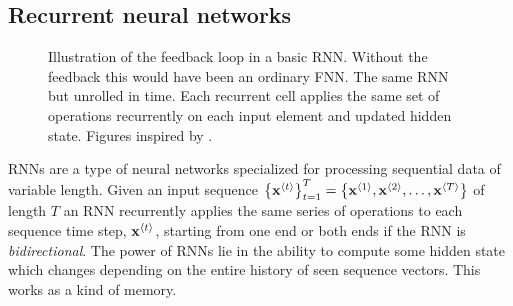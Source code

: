 \subsection{Recurrent neural networks}
\begin{figure}[tbp!]
    \begin{subfigure}[b]{0.25\textwidth}
        \centering
        \resizebox{!}{3cm}{
            
        }
        \caption{}
        \label{fig: Neural networks: RNN}
    \end{subfigure}
    \hfill
    \begin{subfigure}[b]{0.73\textwidth}
        \centering
        \resizebox{!}{3cm}{
            
        }
        \caption{}
        \label{fig: Neural networks: RNN unrolled}
    \end{subfigure}
    \caption{ Illustration of the feedback loop in a basic \gls{RNN}. Without the feedback this would have been an ordinary \gls{FNN}.  The same \gls{RNN} but unrolled in time. Each recurrent cell applies the same set of operations recurrently on each input element and updated hidden state. Figures inspired by \cite{Olah2015}.}
    \label{fig: Neural networks: RNNs}
\end{figure}
\Glspl{RNN} \cite{Rumelhart1986} are a type of neural networks specialized for processing sequential data of variable length. 
Given an input sequence ${\left\{{\mathbf{x}}^{\left\langle t\right\rangle}\right\}}_{t=1}^{T}={\left\{{\mathbf{x}}^{\left\langle1\right\rangle}, {\mathbf{x}}^{\left\langle2\right\rangle}, \dots, {\mathbf{x}}^{\left\langle T\right\rangle}\right\}}$ of length $T$ an \gls{RNN} recurrently applies the same series of operations to each sequence time step, ${\mathbf{x}}^{\left\langle t\right\rangle}$, starting from one end or both ends if the \gls{RNN} is \textit{bidirectional}. The power of \glspl{RNN} lie in the ability to compute some hidden state which changes depending on the entire history of seen sequence vectors. This works as a kind of memory.

